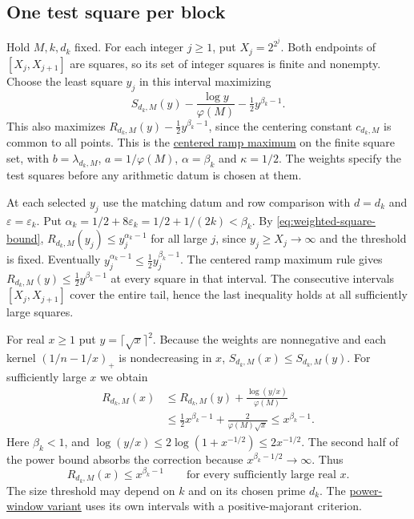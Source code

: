 \subsection*{One test square per block}

%
Hold \(M,k,d_k\) fixed. For each integer \(j\ge1\), put \(X_j=2^{2^j}\).
Both endpoints of \([X_j,X_{j+1}]\) are squares, so its set of integer
squares is finite and nonempty. Choose the least square \(y_j\) in this
interval maximizing
\begin{equation}\label{eq:weighted-square-selection}
 S_{d_k,M}(y)-\frac{\log y}{\varphi(M)}-\tfrac12 y^{\beta_k-1}.
\end{equation}
This also maximizes \(R_{d_k,M}(y)-\tfrac12 y^{\beta_k-1}\), since the
centering constant \(c_{d_k,M}\) is common to all points. This is the
\hyperlink{proof.centered-ramp-maximum}{centered ramp maximum} on the
finite square set, with \(b=\lambda_{d_k,M}\), \(a=1/\varphi(M)\),
\(\alpha=\beta_k\) and \(\kappa=1/2\). The weights specify the test
squares before any arithmetic datum is chosen at them.

%
At each selected \(y_j\) use the matching datum and row comparison with
\(d=d_k\) and \(\varepsilon=\varepsilon_k\). Put
\(\alpha_k=1/2+8\varepsilon_k=1/2+1/(2k)<\beta_k\). By
\eqref{eq:weighted-square-bound}, \(R_{d_k,M}(y_j)\le y_j^{\alpha_k-1}\)
for all large \(j\), since \(y_j\ge X_j\to\infty\) and the threshold is
fixed. Eventually \(y_j^{\alpha_k-1}\le\tfrac12 y_j^{\beta_k-1}\).
The centered ramp maximum rule gives
\(R_{d_k,M}(y)\le\tfrac12 y^{\beta_k-1}\) at every square in that interval.
The consecutive intervals \([X_j,X_{j+1}]\) cover the entire tail, hence
the last inequality holds at all sufficiently large squares.

For real \(x\ge1\) put \(y=\lceil\sqrt x\rceil^2\). Because the weights
are nonnegative and each kernel \((1/n-1/x)_+\) is nondecreasing in \(x\),
\(S_{d_k,M}(x)\le S_{d_k,M}(y)\). For sufficiently large \(x\) we obtain
\begin{align*}
 R_{d_k,M}(x)
 &\le R_{d_k,M}(y)+\frac{\log(y/x)}{\varphi(M)}\\
 &\le \tfrac12 x^{\beta_k-1}+\frac{2}{\varphi(M)\sqrt x}
 \le x^{\beta_k-1}.
\end{align*}
Here \(\beta_k<1\), and \(\log(y/x)\le2\log(1+x^{-1/2})\le2x^{-1/2}\).
The second half of the power bound absorbs the correction because
\(x^{\beta_k-1/2}\to\infty\). Thus
\begin{equation}\label{eq:weighted-real-bound}
 R_{d_k,M}(x)\le x^{\beta_k-1}\qquad\text{for every sufficiently large real }x.
\end{equation}
The size threshold may depend on \(k\) and on its chosen prime \(d_k\).
The \hyperlink{proof.weighted-window-variant}{power-window variant}
uses its own intervals with a positive-majorant criterion.

